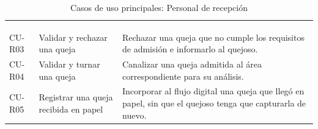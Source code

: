 \small
\renewcommand{\arraystretch}{1.2}
\setlength{\tabcolsep}{4pt}
\begin{longtable}{|L{1.8cm}|L{4.6cm}|L{9.2cm}|}
	\hiderowcolors\caption{Casos de uso principales: Personal de recepción}
	\label{tab:cu_recepcion} \\ \showrowcolors
	\hline
	 &  &  \\
	\hline
	\endfirsthead
	\hline
	 &  &  \\
	\hline
	\endhead
	CU-R03 & Validar y rechazar una queja & Rechazar una queja que no cumple los requisitos de admisión e informarlo al quejoso. \\ \hline
	CU-R04 & Validar y turnar una queja & Canalizar una queja admitida al área correspondiente para su análisis. \\ \hline
	CU-R05 & Registrar una queja recibida en papel & Incorporar al flujo digital una queja que llegó en papel, sin que el quejoso tenga que capturarla de nuevo. \\ \hline
\end{longtable}
\normalsize
\setlength{\tabcolsep}{6pt}
\renewcommand{\arraystretch}{1}

